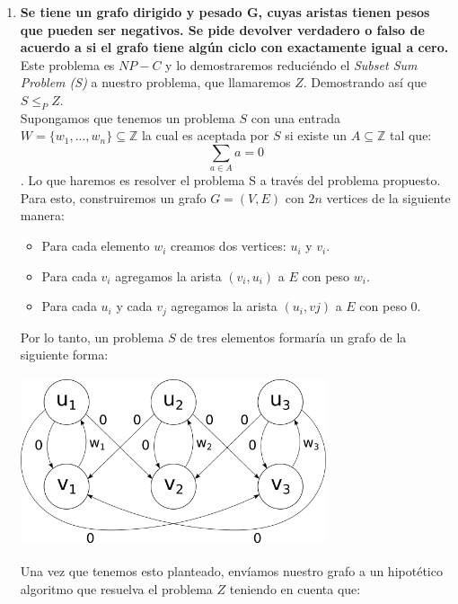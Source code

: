\documentclass{article}
\newcommand{\Z}{\mathbb{Z}}
\newcommand\tab[1][0.5cm]{\hspace*{#1}}
\begin{document}
\begin{enumerate}
        \item \textbf{Se tiene un grafo dirigido y pesado G, cuyas aristas tienen pesos que pueden ser negativos. Se pide
            devolver verdadero o falso de acuerdo a si el grafo tiene algún ciclo con exactamente igual a cero.} \\
            \tab Este problema es $NP-C$ y lo demostraremos reduciéndo el \emph{Subset Sum Problem (S)} a nuestro
            problema, que llamaremos $Z$. Demostrando así que $S \leq_{P} Z$. \\
            \tab\tab Supongamos que tenemos un problema $S$ con una entrada $W = \{w_{1}, ..., w_{n}\} \subseteq \Z$
                la cual es aceptada por $S$ si existe un $A\subseteq \Z$ tal que: $$\sum_{a \in A} a = 0$$.
                \tab Lo que haremos es resolver el problema S a través del problema propuesto. Para esto,
                construiremos un grafo $G = (V, E)$ con $2n$ vertices de la siguiente manera:
                \begin{itemize}
                    \item Para cada elemento $w_{i}$ creamos dos vertices: $u_{i}$ y $v_{i}$.
                    \item Para cada $v_{i}$ agregamos la arista $(v_{i}, u_{i})$ a $E$ con peso $w_{i}$.
                    \item Para cada $u_{i}$ y cada $v_{j}$ agregamos la arista $(u_{i}, v{j})$ a $E$ con peso $0$.
                \end{itemize}
            \tab\tab Por lo tanto, un problema $S$ de tres elementos formaría un grafo de la siguiente forma:
                \begin{center}
                    \includegraphics[width=9cm, height=5cm]{images/Problema6}
                \end{center}
            \tab\tab Una vez que tenemos esto planteado, envíamos nuestro grafo a un hipotético algoritmo
                que resuelva el problema $Z$ teniendo en cuenta que:
                \begin{itemize}

\end{itemize}
\end{enumerate}
\end{document}
